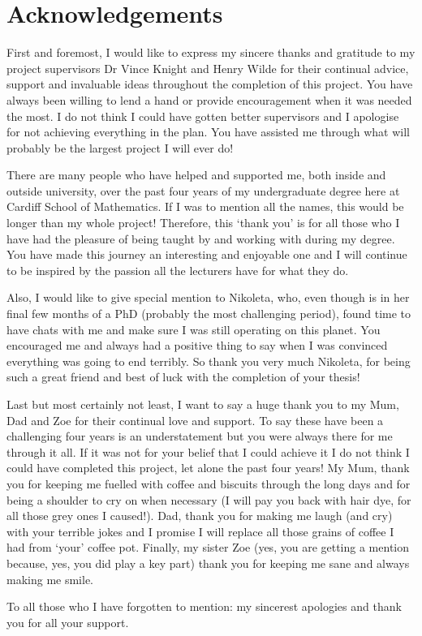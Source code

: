 \chapter{Acknowledgements}

First and foremost, I would like to express my sincere thanks and gratitude to
my project supervisors Dr Vince Knight and Henry Wilde for their continual
advice, support and invaluable ideas throughout the completion of this project.
You have always been willing to lend a hand or provide encouragement when
it was needed the most. I do not think I could have gotten better supervisors
and I apologise for not achieving everything in the plan. You have assisted me
through what will probably be the largest project I will ever do!

There are many people who have helped and supported me, both inside and outside
university, over the past four years of my undergraduate degree here at Cardiff
School of Mathematics. If I was to mention all the names, this would be longer
than my whole project! Therefore, this `thank you' is for all those who I have
had the pleasure of being taught by and working with during my degree. You have
made this journey an interesting and enjoyable one and I will continue to be
inspired by the passion all the lecturers have for what they do. 

Also, I would like to give special mention to Nikoleta, who, even though is in
her final few months of a PhD (probably the most challenging period), found time
to have chats with me and make sure I was still operating on this planet. You
encouraged me and always had a positive thing to say when I was convinced
everything was going to end terribly. So thank you very much Nikoleta, for being
such a great friend and best of luck with the completion of your thesis!

Last but most certainly not least, I want to say a huge thank you to my Mum, Dad
and Zoe for their continual love and support. To say these have been a
challenging four years is an understatement but you were always there for me
through it all. If it was not for your belief that I could achieve it I do not
think I could have completed this project, let alone the past four years! My
Mum, thank you for keeping me fuelled with coffee and biscuits through the long
days and for being a shoulder to cry on when necessary (I will pay you back with
hair dye, for all those grey ones I caused!). Dad, thank you for making me laugh
(and cry) with your terrible jokes and I promise I will replace all those grains
of coffee I had from `your' coffee pot. Finally, my sister Zoe (yes, you are
getting a mention because, yes, you did play a key part) thank you for keeping
me sane and always making me smile.

To all those who I have forgotten to mention: my sincerest apologies and thank
you for all your support.